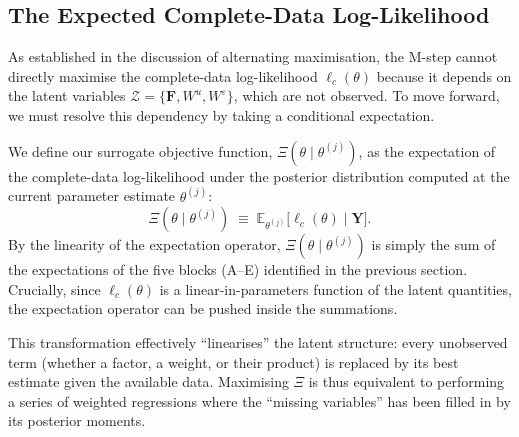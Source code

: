 \documentclass[11pt, a4paper, oneside]{article}
\newcommand{\mY}{\mathbf{Y}}
\newcommand{\mF}{\mathbf{F}}
\begin{document}
\subsection{The Expected Complete-Data Log-Likelihood}

As established in the discussion of alternating maximisation, the M-step cannot directly maximise the complete-data log-likelihood $\ell_c(\theta)$ because it depends on the latent variables $\mathcal{Z} = \{\mF, W^u, W^\varepsilon\}$, which are not observed. To move forward, we must resolve this dependency by taking a conditional expectation.

We define our surrogate objective function, $\Xi(\theta \mid \theta^{(j)})$, as the expectation of the complete-data log-likelihood under the posterior distribution computed at the current parameter estimate $\theta^{(j)}$:
\begin{equation}
\Xi(\theta \mid \theta^{(j)}) \;\equiv\; \mathbb{E}_{\theta^{(j)}} \big[ \ell_c(\theta) \mid \mY \big].
\label{eq:Xi-function}
\end{equation}
By the linearity of the expectation operator, $\Xi(\theta \mid \theta^{(j)})$ is simply the sum of the expectations of the five blocks (A--E) identified in the previous section. Crucially, since $\ell_c(\theta)$ is a linear-in-parameters function of the latent quantities, the expectation operator can be pushed inside the summations. 

This transformation effectively ``linearises'' the latent structure: every unobserved term (whether a factor, a weight, or their product) is replaced by its best estimate given the available data. Maximising $\Xi$ is thus equivalent to performing a series of weighted regressions where the ``missing variables'' has been filled in by its posterior moments.
\end{document}
